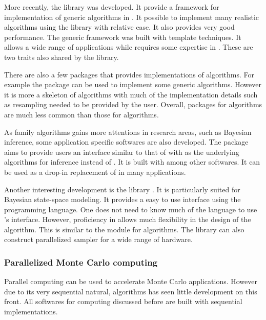 More recently, the \smctc library \cite{smctc} was developed. It provide a
framework for implementation of generic \smc algorithms in \cpp. It possible
to implement many realistic algorithms using the library with relative ease.
It also provides very good performance. The generic framework was built with
\cpp template techniques. It allows a wide range of applications while
requires some expertise in \cpp. These are two traits also shared by the \vsmc
library.

There are also a few \rlang packages that provides implementations of \smc
algorithms. For example the \rsmc \cite{rsmc} package can be used to implement
some generic \smc algorithms. However it is more a skeleton of \smc algorithms
with much of the implementation details such as resampling needed to be
provided by the user. Overall, \rlang packages for \smc algorithms are much
less common than those for \mcmc algorithms.

As \smc family algorithms gains more attentions in research areas, such as
Bayesian inference, some application specific softwares are also developed.
The \biips \cite{biips} package aims to provide users an interface similar to
that of \bugs with \smc as the underlying algorithms for inference instead of
\mcmc. It is built with \smctc among other softwares. It can be used as a
drop-in replacement of \bugs in many applications.

Another interesting development is the \libbi library \cite{libbi}. It is
particularly suited for Bayesian state-space modeling. It provides a easy to
use interface using the \perl programming language. One does not need to know
much of the language to use \libbi's interface. However, proficiency in \perl
allows much flexibility in the design of the algorithm. This is similar to the
\pymc module for \mcmc algorithms. The library can also construct parallelized
sampler for a wide range of hardware.

\subsubsection{Parallelized Monte Carlo computing}
\label{ssub:Parallelized Monte Carlo computing}

Parallel computing can be used to accelerate Monte Carlo applications. However
due to its very sequential natural, \mcmc algorithms has seen little
development on this front. All softwares for \mcmc computing discussed before
are built with sequential implementations.

